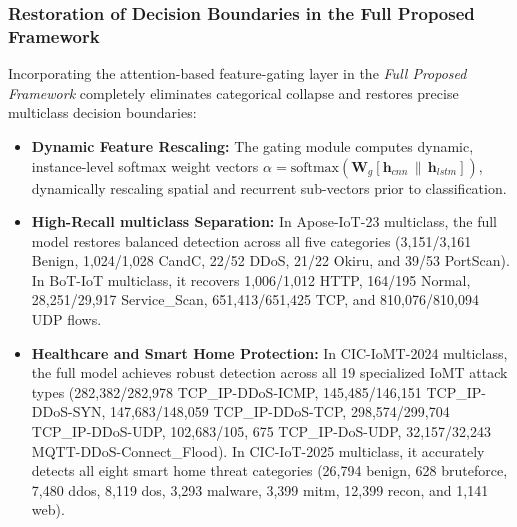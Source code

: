 \documentclass[a4paper,fleqn]{cas-sc}
\begin{document}
\subsubsection{Restoration of Decision Boundaries in the Full Proposed Framework}
Incorporating the attention-based feature-gating layer in the \textit{Full Proposed Framework} completely eliminates categorical collapse and restores precise multiclass decision boundaries:
\begin{itemize}
    \item \textbf{Dynamic Feature Rescaling:} The gating module computes dynamic, instance-level softmax weight vectors $\alpha = \text{softmax}(\mathbf{W}_g [\mathbf{h}_{cnn} \,\|\, \mathbf{h}_{lstm}])$, dynamically rescaling spatial and recurrent sub-vectors prior to classification.
    \item \textbf{High-Recall multiclass Separation:} In Apose-IoT-23 multiclass, the full model restores balanced detection across all five categories (3,151/3,161 Benign, 1,024/1,028 CandC, 22/52 DDoS, 21/22 Okiru, and 39/53 PortScan). In BoT-IoT multiclass, it recovers 1,006/1,012 HTTP, 164/195 Normal, 28,251/29,917 Service\_Scan, 651,413/651,425 TCP, and 810,076/810,094 UDP flows.
    \item \textbf{Healthcare and Smart Home Protection:} In CIC-IoMT-2024 multiclass, the full model achieves robust detection across all 19 specialized IoMT attack types (282,382/282,978 TCP\_IP-DDoS-ICMP, 145,485/146,151 TCP\_IP-DDoS-SYN, 147,683/148,059 TCP\_IP-DDoS-TCP, 298,574/299,704 TCP\_IP-DDoS-UDP, 102,683/105, 675 TCP\_IP-DoS-UDP, 32,157/32,243 MQTT-DDoS-Connect\_Flood). In CIC-IoT-2025 multiclass, it accurately detects all eight smart home threat categories (26,794 benign, 628 bruteforce, 7,480 ddos, 8,119 dos, 3,293 malware, 3,399 mitm, 12,399 recon, and 1,141 web).
\end{itemize}
\end{document}
